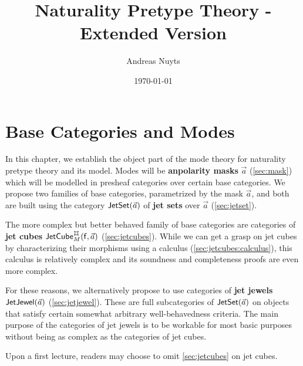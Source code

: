 \documentclass[a4paper]{memoir}
\newcommand{\thetitle}{Naturality Pretype Theory - Extended Version}
\newcommand{\theauthors}{Andreas Nuyts}
\begin{document}
	\addtolength{\voffset}{-.5in}

\title{\thetitle}
\date{\today}
\author{\theauthors{}}
\maketitle

\pagebreak

\tableofcontents

\pagebreak

\chapter{Base Categories and Modes}

In this chapter, we establish the object part of the mode theory for naturality pretype theory and its model.
Modes will be \textbf{anpolarity masks} $\vec a$ (\cref{sec:mask}) which will be modelled in presheaf categories over certain base categories.
We propose two families of base categories, parametrized by the mask $\vec a$, and both are built using the category $\mathsf{JetSet}(\vec a)$ of \textbf{jet sets} over $\vec a$ (\cref{sec:jetset}).

The more complex but better behaved family of base categories are categories of \textbf{jet cubes} $\jetcubefwd \mycubex M {\vec a}$ (\cref{sec:jetcubes}).
While we can get a grasp on jet cubes by characterizing their morphisms using a calculus (\cref{sec:jetcubes:calculus}), this calculus is relatively complex and its soundness and completeness proofs are even more complex.

For these reasons, we alternatively propose to use categories of \textbf{jet jewels} $\mathsf{JetJewel}(\vec a)$ (\cref{sec:jetjewel}). These are full subcategories of $\mathsf{JetSet}(\vec a)$ on objects that satisfy certain somewhat arbitrary well-behavedness criteria.
The main purpose of the categories of jet jewels is to be workable for most basic purposes without being as complex as the categories of jet cubes.

Upon a first lecture, readers may choose to omit \cref{sec:jetcubes} on jet cubes.

\end{document}
